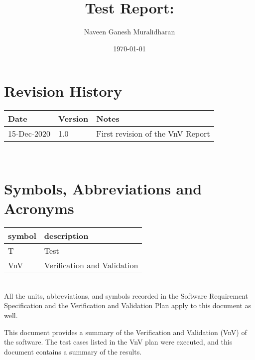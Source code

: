 \documentclass[12pt, titlepage]{article}
\begin{document}
\title{Test Report: \progname{}} 
\author{Naveen Ganesh Muralidharan}
\date{\today}
	
\maketitle


\section{Revision History}

\begin{tabularx}{\textwidth}{p{3cm}p{2cm}X}
\toprule {\bf Date} & {\bf Version} & {\bf Notes}\\
\midrule
15-Dec-2020 & 1.0 & First revision of the VnV Report\\

\bottomrule
\end{tabularx}

~\newpage

\section{Symbols, Abbreviations and Acronyms}

\renewcommand{\arraystretch}{1.2}
\begin{tabular}{l l} 
  \toprule		
  \textbf{symbol} & \textbf{description}\\
  \midrule 
  T & Test\\
 VnV & Verification and Validation\\
  \bottomrule
\end{tabular}\\

All the units, abbreviations, and symbols recorded in the Software Requirement 
Specification \cite{SRS} and the Verification and Validation Plan \cite{VnVPlan}  
apply to this document as well.


\newpage

\tableofcontents

\listoftables %

\newpage


This document provides a summary of the Verification and Validation (VnV) of the 
\progname{} software. The test cases listed in the VnV plan \cite{VnVPlan} 
were executed, and this document contains a summary of the results.
\end{document}
